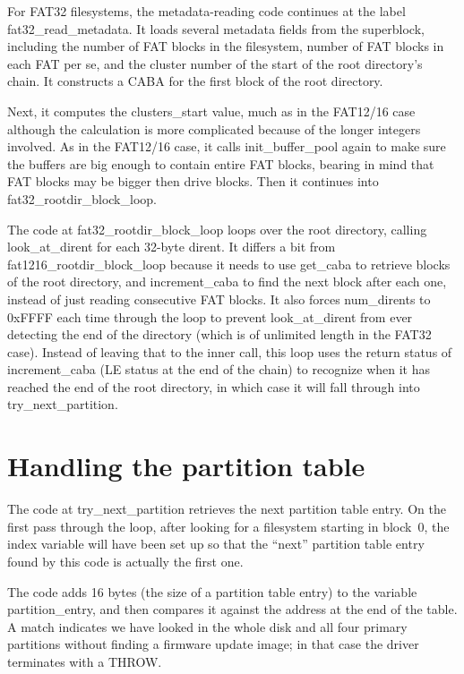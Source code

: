For FAT32 filesystems, the metadata-reading code continues at the label
fat32\_read\_metadata.  It loads several metadata fields from the
superblock, including the number of FAT blocks in the filesystem, number of
FAT blocks in each FAT per se, and the cluster number of the start of the
root directory's chain.  It constructs a CABA for the first block of the
root directory.

Next, it computes the clusters\_start value, much as in the FAT12/16 case
although the calculation is more complicated because of the longer integers
involved.  As in the FAT12/16 case, it calls init\_buffer\_pool again to
make sure the buffers are big enough to contain entire FAT blocks, bearing
in mind that FAT blocks may be bigger then drive blocks.  Then it continues
into fat32\_rootdir\_block\_loop.

The code at fat32\_rootdir\_block\_loop loops over the root directory,
calling look\_at\_dirent for each 32-byte dirent.  It differs a bit from
fat1216\_rootdir\_block\_loop because it needs to use get\_caba to retrieve
blocks of the root directory, and increment\_caba to find the next block
after each one, instead of just reading consecutive FAT blocks.  It also
forces num\_dirents to 0xFFFF each time through the loop to prevent
look\_at\_dirent from ever detecting the end of the directory (which is of
unlimited length in the FAT32 case).  Instead of leaving that to the inner
call, this loop uses the return status of increment\_caba (LE status at the
end of the chain) to recognize when it has reached the end of the root
directory, in which case it will fall through into try\_next\_partition.

\section{Handling the partition table}

The code at try\_next\_partition retrieves the next partition table entry. 
On the first pass through the loop, after looking for a filesystem starting
in block~0, the index variable will have been set up so that the ``next''
partition table entry found by this code is actually the first one.

The code adds 16 bytes (the size of a partition table entry) to the variable
partition\_entry, and then compares it against the address at the end of the
table.  A match indicates we have looked in the whole disk and all
four primary partitions without finding a firmware update image; in that
case the driver terminates with a THROW.

